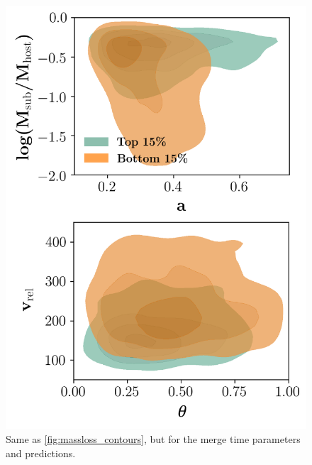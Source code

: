 \documentclass[fleqn,usenatbib]{mnras}
\begin{document}
{\begin{figure}
	\includegraphics[width=\textwidth]{Figures/time_contours}
    \vspace{-20pt}
    \caption{Same as \ref{fig:massloss_contours}, but for the merge time parameters and predictions.}
    \label{fig:time_contours}
\end{figure}


}
\end{document}
